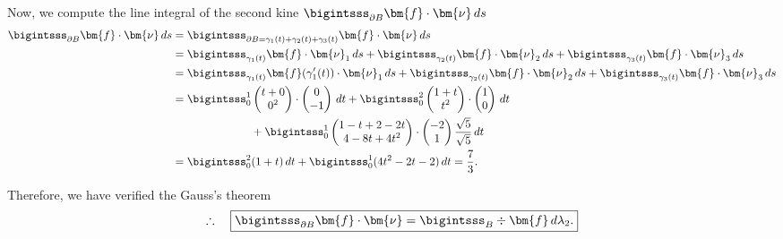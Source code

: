 \documentclass[12pt]{article}
\begin{document}
\begin{enumerate}[(i)]
	      Now, we compute the line integral of the second kine
	      $\bigintsss_{\partial B} \bm{f}\cdot \bm{\nu} \, ds$
	      \begin{align}
		      \bigintsss_{\partial B} \bm{f}\cdot\bm{\nu} \, ds
		       & =
		      \bigintsss_{\partial B = \gamma_1(t) + \gamma_2(t) + \gamma_3(t)} \bm{f}\cdot\bm{\nu} \, ds
		      \\
		       & =
		      \bigintsss_{\gamma_1(t)} \bm{f}\cdot\bm{\nu}_1 \, ds +
		      \bigintsss_{\gamma_2(t)} \bm{f}\cdot\bm{\nu}_2 \, ds +
		      \bigintsss_{\gamma_3(t)} \bm{f}\cdot\bm{\nu}_3 \, ds                                  \\
		       & =
		      \bigintsss_{\gamma_1(t)} \bm{f}(\gamma_1'(t)) \cdot\bm{\nu}_1 \, ds +
		      \bigintsss_{\gamma_2(t)} \bm{f}\cdot\bm{\nu}_2 \, ds +
		      \bigintsss_{\gamma_3(t)} \bm{f}\cdot\bm{\nu}_3 \, ds
		      \\
		       & =\bigintsss_0^1
		      \begin{pmatrix}t+0 \\0^2 \end{pmatrix} \cdot \begin{pmatrix}0 \\-1 \end{pmatrix} \, dt
		      + \bigintsss_0^2
		      \begin{pmatrix}1+t \\t^2 \end{pmatrix} \cdot \begin{pmatrix}1 \\0 \end{pmatrix} \, dt \\
		       & \quad\quad\quad\quad\quad\quad\quad
		      + \bigintsss_0^1
		      \begin{pmatrix}1-t+2-2t \\ 4-8t+4t^2\end{pmatrix} \cdot \begin{pmatrix}-2\\1\end{pmatrix}
		      \frac{\sqrt{5}}{\sqrt{5}} \, dt                                                       \\
		       & =\bigintsss_0^2 (1+t) \, dt
		      + \bigintsss_0^1 (4t^2-2t-2) \, dt
		      = \frac{7}{3}.
	      \end{align}
\end{enumerate}


Therefore, we have verified the Gauss's theorem
\begin{align}
	\therefore\quad
	\boxed{
		\bigintsss_{\partial B} \bm{f} \cdot \bm{\nu}
		= \bigintsss_B \div \bm{f} \, d\lambda_2.
	}
\end{align}



% 
\end{document}
